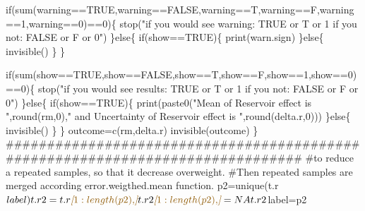 \documentclass[
]{article}
\newenvironment{Shaded}{\begin{snugshade}}{\end{snugshade}}
\newcommand{\CommentTok}[1]{\textcolor[rgb]{0.56,0.35,0.01}{\textit{#1}}}
\newcommand{\NormalTok}[1]{#1}
\newcommand{\OtherTok}[1]{\textcolor[rgb]{0.56,0.35,0.01}{#1}}
\begin{document}
\begin{Shaded}
\begin{Highlighting}[]
\NormalTok{if(sum(warning==TRUE,warning==FALSE,warning==T,warning==F,warning==1,warning==0)==0)\{}
\NormalTok{    stop("if you would see warning: TRUE or T or 1 if you not: FALSE or F or 0") }
\NormalTok{  \}else\{  }
\NormalTok{    if(show==TRUE)\{}
\NormalTok{      print(warn.sign)}
\NormalTok{    \}else\{}
\NormalTok{      invisible()}
\NormalTok{    \}}
\NormalTok{  \}}

\NormalTok{if(sum(show==TRUE,show==FALSE,show==T,show==F,show==1,show==0)==0)\{}
\NormalTok{  stop("if you would see results: TRUE or T or 1 if you not: FALSE or F or 0") }
\NormalTok{  \}else\{  }
\NormalTok{    if(show==TRUE)\{}
\NormalTok{      print(paste0("Mean of Reservoir effect is ",round(rm,0)," and Uncertainty of Reservoir effect is ",round(delta.r,0)))}
\NormalTok{    \}else\{}
\NormalTok{      invisible()}
\NormalTok{    \}}
\NormalTok{  \}}
\NormalTok{outcome=c(rm,delta.r)}
\NormalTok{invisible(outcome)  }
\NormalTok{\}}
\NormalTok{\#\#\#\#\#\#\#\#\#\#\#\#\#\#\#\#\#\#\#\#\#\#\#\#\#\#\#\#\#\#\#\#\#\#\#\#\#\#\#\#\#\#\#\#\#\#\#\#\#\#\#\#\#\#\#\#\#\#\#\#\#\#\#\#\#\#\#\#\#\#\#\#\#\#\#\#\#\#\#}
\NormalTok{\#to reduce a repeated samples, so that it decrease overweight.}
\NormalTok{\#Then repeated samples are merged according error.weigthed.mean function.}
\NormalTok{p2=unique(t.r$label)}
\NormalTok{t.r2=t.r}\CommentTok{[}\OtherTok{1:length(p2),}\CommentTok{]}
\NormalTok{t.r2}\CommentTok{[}\OtherTok{1:length(p2),}\CommentTok{]}\NormalTok{=NA}
\NormalTok{t.r2$label=p2}


\end{Highlighting}
\end{Shaded}
\end{document}
